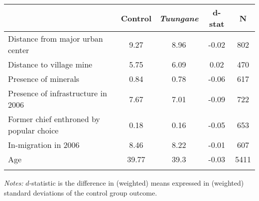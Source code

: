 \begin{tabular}{lcccc}  
 	&	Control	&	\textit{Tuungane}	&	d-stat	&	N	 \\ \hline \hline  
 Distance from major urban center&9.27&8.96&-0.02&802 \\  
 Distance to village mine&5.75&6.09&0.02&470 \\  
 Presence of minerals&0.84&0.78&-0.06&617 \\  
 Presence of infrastructure in 2006&7.67&7.01&-0.09&722 \\  
 Former chief enthroned by popular choice&0.18&0.16&-0.05&653 \\  
 In-migration in 2006&8.46&8.22&-0.01&607 \\  
 Age&39.77&39.3&-0.03&5411 \\  
 \hline \hline  
 \label{table_balance}  
 \end{tabular}  
 \begin{flushleft}\textit{Notes:} $d$-statistic is the difference in (weighted) means expressed in (weighted) standard deviations of the control group outcome.\end{flushleft}  
